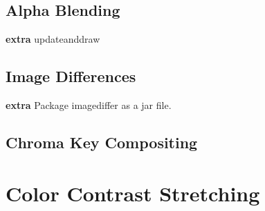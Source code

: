 \documentclass{book}
\begin{document}
\subsection{Alpha Blending}


\begin{exercise}

\end{exercise}

\begin{exercise}\textbf{extra}
updateanddraw
\end{exercise}

\subsection{Image Differences}

\begin{exercise}\textbf{extra}
Package imagediffer as a jar file. 
\end{exercise}

\subsection{Chroma Key Compositing}

\section{Color Contrast Stretching}\label{sec:color-contrast-stretching}

\end{document}
